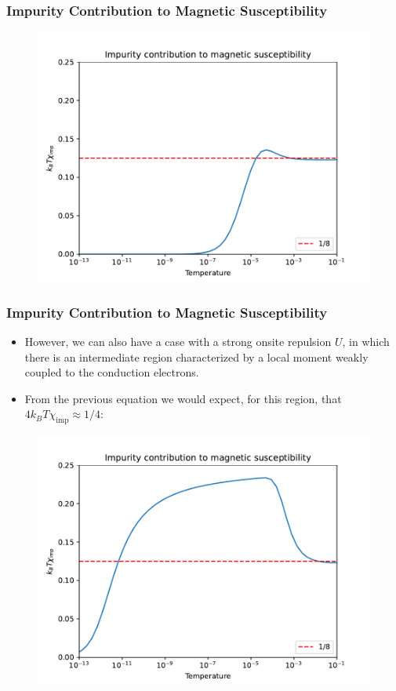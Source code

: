 \documentclass{beamer}
\begin{document}
\begin{frame}
  \frametitle{Impurity Contribution to Magnetic Susceptibility}

  \begin{figure}
    \centering
    \includegraphics[width=0.75\linewidth]{./gfx/tchi_lowU.pdf}
  \end{figure}
\end{frame}

\begin{frame}
  \frametitle{Impurity Contribution to Magnetic Susceptibility}

  \begin{itemize}
  \item However, we can also have a case with a strong onsite repulsion $U$, in which there is an intermediate region characterized by a local moment weakly coupled to the conduction electrons.
  \item From the previous equation we would expect, for this region, that $4k_BT\chi_{\mathrm{imp}} \approx 1/4$:
  \end{itemize}

  \begin{figure}
    \centering
    \includegraphics[width=0.6\linewidth]{./gfx/tchi.pdf}
  \end{figure}
\end{frame}
\end{document}
